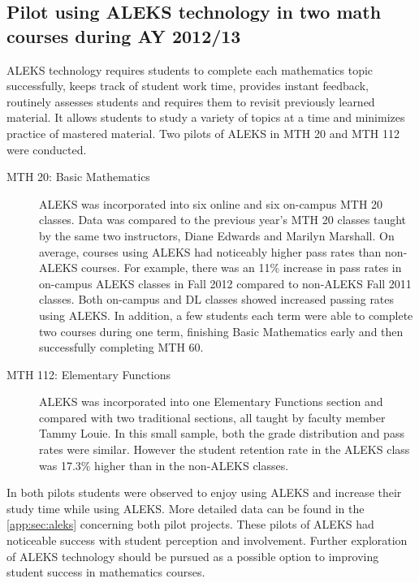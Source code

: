 \subsection[ALEKS pilot]{Pilot using ALEKS technology in two math courses during AY 2012/13}\label{sec3:subset:alekspilot}
ALEKS technology requires students to complete each mathematics topic
successfully, keeps track of student work time, provides instant feedback,
routinely assesses students and requires them to revisit previously learned
material.  It allows students to study a variety of topics at a time and
minimizes practice of mastered material. Two pilots of ALEKS in MTH 20 and MTH
112 were conducted.

\begin{description}
\item[MTH 20: Basic Mathematics] ALEKS was incorporated into six online and six
  on-campus MTH 20 classes.  Data was compared to the previous year's MTH 20
  classes taught by the same two instructors, Diane Edwards and Marilyn
  Marshall.  On average, courses using ALEKS had noticeably higher pass rates
  than non-ALEKS courses.  For example, there was an 11\% increase in pass rates
  in on-campus ALEKS classes in Fall 2012 compared to non-ALEKS Fall 2011
  classes.  Both on-campus and DL classes showed increased passing rates using
  ALEKS.  In addition, a few students each term were able to complete two
  courses during one term, finishing Basic Mathematics early and then
  successfully completing MTH 60.

\item[MTH 112: Elementary Functions] ALEKS was incorporated into one Elementary
  Functions section and compared with two traditional sections, all taught by
  faculty member Tammy Louie.  In this small sample, both the grade distribution
  and pass rates were similar.  However the student retention rate in the ALEKS
  class was 17.3\% higher than in the non-ALEKS classes.  
 
 \end{description}
 
In both pilots students were observed to enjoy using ALEKS and increase their
study time while using ALEKS.  More detailed data can be found in the
\vref{app:sec:aleks} concerning both pilot projects. These pilots of ALEKS had
noticeable success with student perception and involvement.  Further
exploration of ALEKS technology should be pursued as a possible option to
improving student success in mathematics courses.
 
